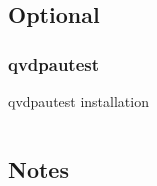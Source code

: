 \documentclass[11pt, a4paper,ngerman]{article}
\begin{document}

\newpage %

\subsection{Optional}

\subsubsection{qvdpautest}

\begin{mintedbox}[breakable=true,
 bottomrule=0.5mm,
 width=\paperwidth-3cm,
 boxsep=1mm, 
 enhanced=true,
 colframe = monoblack,
 drop fuzzy shadow,
 colback = black
 ]{qvdpautest installation}%
 

     \inputminted[firstline=3,lastline=32, 
     linenos=true, framesep=2mm, mathescape, numbersep=5pt,tabsize=4,%
]{bash}{includes/qvdpau.sh}%

\end{mintedbox}%
\vspace{0.2cm}

\newpage %
\subsection{Notes}



%
\end{document}

